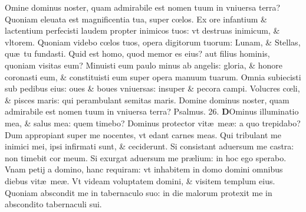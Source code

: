 \documentclass[a5paper,10pt]{book}
\def\ae{æ}
\def\oe{œ}
\begin{document}
\begin{multicols*}{2}
Omine dominus noster, quam admirabile est nomen tuum in vniuersa terra?
\newline \color{red} Q\color{black}uoniam eleuata est magnificentia tua, super c\oe los.
\newline \color{red} E\color{black}x ore infantium \& lactentium perfecisti laudem propter inimicos tuos: vt destruas inimicum, \& vltorem.
\newline \color{red} Q\color{black}uoniam videbo c\oe los tuos, opera digitorum tuorum: Lunam, \& Stellas, qu\ae \ tu fundasti.
\newline \color{red} Q\color{black}uid est homo, quod memor es eius? aut filius hominis, quoniam visitas eum?
\newline \color{red} M\color{black}inuisti eum paulo minus ab angelis: gloria, \& honore coronasti eum, \& constituisti eum super opera manuum tuarum.
\newline \color{red} O\color{black}mnia subiecisti sub pedibus eius: oues \& boues vniuersas: insuper \& pecora campi.
\newline \color{red} V\color{black}olucres c\oe li, \& pisces maris: qui perambulant semitas maris.
\newline \color{red} D\color{black}omine dominus noster, quam admirabile est nomen tuum in vniuersa terra? \quad \color{red} Psalmus. \hypertarget{ps26}{26.} \color{black}
\vspace{-1em}
\lettrine[lines=2]{\bfseries \color{red} D}{}Ominus illuminatio mea, \& salus mea: quem timebo?
\newline \color{red} D\color{black}ominus protector vit\ae \ me\ae : a quo trepidabo?
\newline \color{red} D\color{black}um appropiant super me nocentes, vt edant carnes meas.
\newline \color{red} Q\color{black}ui tribulant me inimici mei, ipsi infirmati sunt, \& ceciderunt.
\newline \color{red} S\color{black}i consistant aduersum me castra: non timebit cor meum.
\newline \color{red} S\color{black}i exurgat aduersum me pr\ae lium: in hoc ego sperabo.
\newline \color{red} V\color{black}nam petij a domino, hanc requiram: vt inhabitem in domo domini omnibus diebus vit\ae \ me\ae .
\newline \color{red} V\color{black}t videam voluptatem domini, \& visitem templum eius.
\newline \color{red} Q\color{black}uoniam abscondit me in tabernaculo suo: in die malorum protexit me in abscondito tabernaculi sui.

\end{multicols*}
\end{document}
